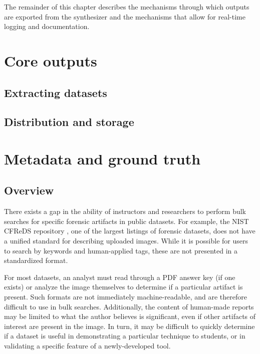 \documentclass[letterpaper,12pt]{report}
\begin{document}
The remainder of this chapter describes the mechanisms through which
outputs are exported from the synthesizer and the mechanisms that allow
for real-time logging and documentation.

\section{Core outputs}\label{core-outputs}

\subsection{Extracting datasets}\label{extracting-datasets}

\subsection{Distribution and
storage}\label{distribution-and-storage}

\section{Metadata and ground
truth}\label{metadata-and-ground-truth}

\subsection{Overview}\label{overview-1}

There exists a gap in the ability of instructors and researchers to
perform bulk searches for specific forensic artifacts in public
datasets. For example, the NIST CFReDS repository
\cite{nationalinstituteofstandardsandtechnologyCFReDSPortal}, one of
the largest listings of forensic datasets, does not have a unified
standard for describing uploaded images. While it is possible for users
to search by keywords and human-applied tags, these are not presented in
a standardized format.

For most datasets, an analyst must read through a PDF answer key (if one
exists) or analyze the image themselves to determine if a particular
artifact is present. Such formats are not immediately machine-readable,
and are therefore difficult to use in bulk searches. Additionally, the
content of human-made reports may be limited to what the author believes
is significant, even if other artifacts of interest are present in the
image. In turn, it may be difficult to quickly determine if a dataset is
useful in demonstrating a particular technique to students, or in
validating a specific feature of a newly-developed tool.
\end{document}
